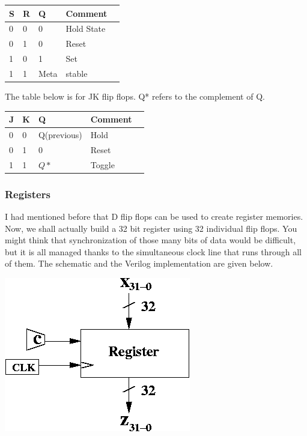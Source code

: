 \documentclass[11pt]{article}
\begin{document}
\begin{description}
\begin{center}
	\begin{tabular}{ | l | l | l | l | p{5cm}  |}
	\hline
	S&R&Q&Comment \\ \hline
	0&0&0&Hold State \\ \hline
	0&1&0&Reset \\ \hline
	1&0&1&Set \\ \hline
	1&1&Meta&stable \\ \hline
	\hline
	\end{tabular}
\end{center}
	The table below is for JK flip flops. Q* refers to the complement of Q.
\begin{center}
	\begin{tabular}{ | l | l | l | l | p{5cm}  |}
	\hline
	J&K&Q&Comment \\ \hline
	0&0&Q(previous)&Hold \\ \hline
	0&1&0&Reset \\ \hline
	1&1&$Q*$&Toggle \\ \hline
	\hline
	\end{tabular}
\end{center}

\subsubsection{Registers}
I had mentioned before that D flip flops can be used to create register memories. Now, we shall actually build a 32 bit register using 32 individual flip flops. You might think that synchronization of those many bits of data would be difficult, but it is all managed thanks to the simultaneous clock line that runs through all of them. The schematic and the Verilog implementation are given below.

\includegraphics[scale=0.7]{pload.png}




\end{description}
\end{document}

